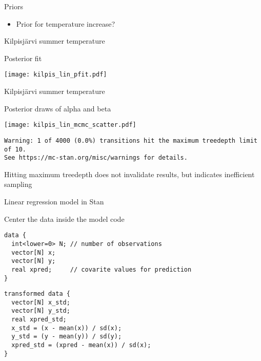\documentclass[finnish,english,t]{beamer}
\begin{document}
\begin{frame}{Priors}

  \begin{itemize}
  \item Prior for temperature increase?
  \end{itemize}

\end{frame}

\begin{frame}{Kilpisjärvi summer temperature}

  Posterior fit
  
  \begin{center}
    \texttt{[image: kilpis\_lin\_pfit.pdf]}
  \end{center}

\end{frame}

\begin{frame}[fragile]{Kilpisjärvi summer temperature}
  
  Posterior draws of alpha and beta
  
  \begin{center}
    \texttt{[image: kilpis\_lin\_mcmc\_scatter.pdf]}
  \end{center}

\scriptsize
{}
\begin{verbatim}
Warning: 1 of 4000 (0.0%) transitions hit the maximum treedepth limit of 10.
See https://mc-stan.org/misc/warnings for details.
\end{verbatim}
\small
Hitting maximum treedepth does not invalidate results, but indicates
inefficient sampling
  
\end{frame}

\begin{frame}[fragile]{Linear regression model in Stan}

Center the data inside the model code
  
{\footnotesize
\begin{verbatim}
data {
  int<lower=0> N; // number of observations
  vector[N] x; 
  vector[N] y; 
  real xpred;     // covarite values for prediction
}
\end{verbatim}
\begin{verbatim}
transformed data {
  vector[N] x_std;
  vector[N] y_std;
  real xpred_std;
  x_std = (x - mean(x)) / sd(x);
  y_std = (y - mean(y)) / sd(y);
  xpred_std = (xpred - mean(x)) / sd(x);
}
\end{verbatim}
}
\end{frame}
\end{document}
